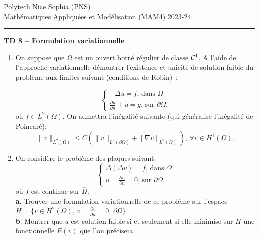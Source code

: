 \documentclass[12pt,a4paper]{article}
\begin{document}
 \hfill Polytech Nice Sophia (PNS)\\
\noindent Math\'ematiques Appliqu\'ees et Mod\'elisation (MAM4) \hfill 2023-24 \\

\hrule

\bigskip
\bigskip

\begin{center} {\bf TD 8 -- Formulation variationnelle} \end{center}

\bigskip

\begin{enumerate}

\item On suppose que $\Omega$ est un ouvert borné régulier de classe ${\cal C}^1$.
A l'aide de l'approche variationnelle démontrer l'existence et unicité de solution faible
du problème aux limites suivant (conditions de Robin)~:

\begin{equation}\label{Robin}
\begin{cases}
-\Delta u = f,\,\text{dans }\Omega\\
\frac{\partial u}{\partial n} + u = g,\,\text{sur }\partial\Omega.
\end{cases}
\end{equation}
où $f\in L^2(\Omega)$. On admettra l'inégalité suivante (qui généralise l'inégalité de Poincaré):
$$
\|v\|_{L^2(\Omega)} \le C (\|v\|_{L^2(\partial\Omega)} +\| \nabla v\|_{L^2(\Omega)} ),\, \forall v \in H^1(\Omega).
$$

\item On consid\`ere le probl\`eme des plaques suivant:
\begin{equation}\label{Plaque}
\begin{cases}
\Delta(\Delta u) = f,\,\text{dans }\Omega\\
u = \frac{\partial u}{\partial n} = 0,\,\text{sur }\partial\Omega.
\end{cases}
\end{equation}
o\`u $f$ est continue sur $\bar\Omega$.\\
{\bf a}. Trouver une formulation variationnelle de ce probl\`eme sur l'espace
$H=\{v\in H^2(\Omega),\, v=\frac{\partial v}{\partial n}=0,\, \partial\Omega\}$.\\
{\bf b}. Montrer que $u$ est solution faible si et seulement si elle minimise sur $H$
une fonctionnelle $E(v)$ que l'on pr\'ecisera.\\


\end{enumerate}
\end{document}
